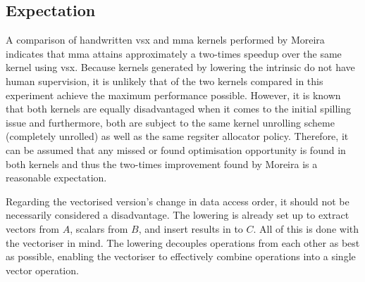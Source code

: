 \documentclass[\main/thesis.tex]{subfiles}
\begin{document}
\subsection{Expectation}
A comparison of handwritten \gls{vsx} and \gls{mma} kernels performed by Moreira \etal~\autocite{moreira2021matrix} indicates that \gls{mma} attains approximately a two-times speedup over the same kernel using \gls{vsx}.
Because kernels generated by lowering the  intrinsic do not have human supervision, it is unlikely that of the two kernels compared in this experiment achieve the maximum performance possible.
However, it is known that both kernels are equally disadvantaged when it comes to the initial spilling issue and furthermore, both are subject to the same kernel unrolling scheme (\ie completely unrolled) as well as the same regsiter allocator policy.
Therefore, it can be assumed that any missed or found optimisation opportunity is found in both kernels and thus the two-times improvement found by Moreira \etal is a reasonable expectation.

Regarding the vectorised version's change in data access order, it should not be necessarily considered a disadvantage.
The lowering is already set up to extract vectors from $A$, scalars from $B$, and insert results in to $C$.
All of this is done with the vectoriser in mind.
The lowering decouples operations from each other as best as possible, enabling the vectoriser to effectively combine operations into a single vector operation.

\end{document}
